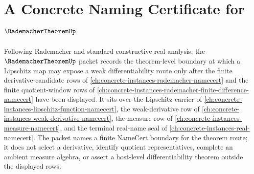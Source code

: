 \chapter{A Concrete Naming Certificate for $\RademacherTheoremUp$}
\label{ch:concrete-instances-rademacher-theorem-namecert}

Following Rademacher and standard constructive real analysis, the $\RademacherTheoremUp$ packet records the theorem-level boundary at which a Lipschitz map may expose a weak differentiability route only after the finite derivative-candidate rows of \autoref{ch:concrete-instances-rademacher-namecert} and the finite quotient-window rows of \autoref{ch:concrete-instances-rademacher-finite-difference-namecert} have been displayed. It sits over the Lipschitz carrier of \autoref{ch:concrete-instances-lipschitz-function-namecert}, the weak-derivative row of \autoref{ch:concrete-instances-weak-derivative-namecert}, the measure row of \autoref{ch:concrete-instances-measure-namecert}, and the terminal real-name seal of \autoref{ch:concrete-instances-real-namecert}. The packet names a finite NameCert boundary for the theorem route; it does not select a derivative, identify quotient representatives, complete an ambient measure algebra, or assert a host-level differentiability theorem outside the displayed rows.

